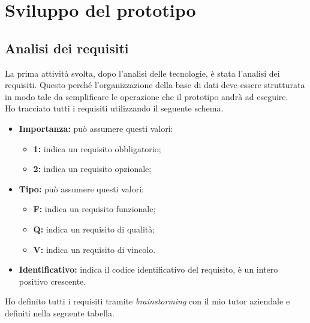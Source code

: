 \section{Sviluppo del prototipo}
\subsection{Analisi dei requisiti}
La prima attività svolta, dopo l'analisi delle tecnologie, è stata l'analisi dei requisiti. Questo perché l'organizzazione della base di dati deve essere strutturata in modo tale da semplificare le operazione che il prototipo andrà ad eseguire.\\
Ho tracciato tutti i requisiti utilizzando il seguente schema.\\
\begin{itemize}
	\item \textbf{Importanza:} può assumere questi valori:
  		\begin{itemize}
    		\item \textbf{1:} indica un requisito obbligatorio;
    		\item \textbf{2:} indica un requisito opzionale;
  		\end{itemize}
  	\item \textbf{Tipo:} può assumere questi valori:
  		\begin{itemize}
   		 	\item \textbf{F:} indica un requisito funzionale;
    		\item \textbf{Q:} indica un requisito di qualità;
    		\item \textbf{V:} indica un requisito di vincolo.
  		\end{itemize}
  	\item \textbf{Identificativo:} indica il codice identificativo del requisito, è un intero positivo crescente.
\end{itemize}
Ho definito tutti i requisiti tramite \textit{brainstorming} con il mio tutor aziendale e definiti nella seguente tabella.
\label{tab:rec}
